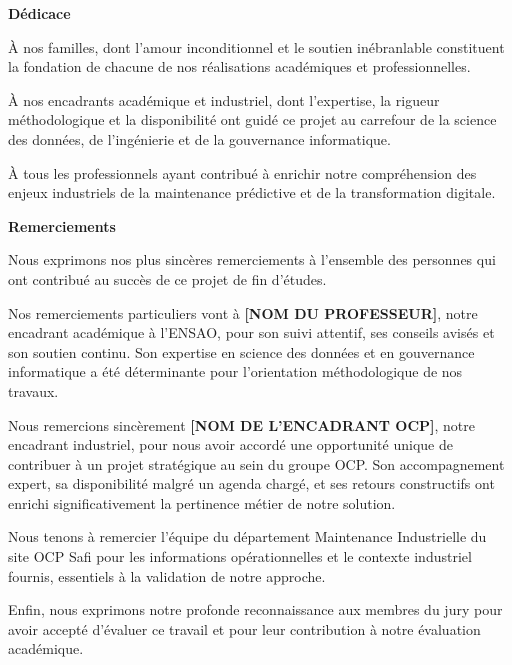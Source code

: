 \documentclass[a4paper,12pt,twoside]{report}
\begin{document}
\newpage
\thispagestyle{empty}
\begin{center}
\Large\textbf{Dédicace}
\end{center}

\vspace{3cm}

À nos familles, dont l'amour inconditionnel et le soutien inébranlable constituent la fondation de chacune de nos réalisations académiques et professionnelles.

À nos encadrants académique et industriel, dont l'expertise, la rigueur méthodologique et la disponibilité ont guidé ce projet au carrefour de la science des données, de l'ingénierie et de la gouvernance informatique.

À tous les professionnels ayant contribué à enrichir notre compréhension des enjeux industriels de la maintenance prédictive et de la transformation digitale.

\newpage
\thispagestyle{empty}
\begin{center}
\Large\textbf{Remerciements}
\end{center}

\vspace{2.5cm}

Nous exprimons nos plus sincères remerciements à l'ensemble des personnes qui ont contribué au succès de ce projet de fin d'études.

Nos remerciements particuliers vont à \textbf{[NOM DU PROFESSEUR]}, notre encadrant académique à l'ENSAO, pour son suivi attentif, ses conseils avisés et son soutien continu. Son expertise en science des données et en gouvernance informatique a été déterminante pour l'orientation méthodologique de nos travaux.

Nous remercions sincèrement \textbf{[NOM DE L'ENCADRANT OCP]}, notre encadrant industriel, pour nous avoir accordé une opportunité unique de contribuer à un projet stratégique au sein du groupe OCP. Son accompagnement expert, sa disponibilité malgré un agenda chargé, et ses retours constructifs ont enrichi significativement la pertinence métier de notre solution.

Nous tenons à remercier l'équipe du département Maintenance Industrielle du site OCP Safi pour les informations opérationnelles et le contexte industriel fournis, essentiels à la validation de notre approche.

Enfin, nous exprimons notre profonde reconnaissance aux membres du jury pour avoir accepté d'évaluer ce travail et pour leur contribution à notre évaluation académique.
\end{document}
